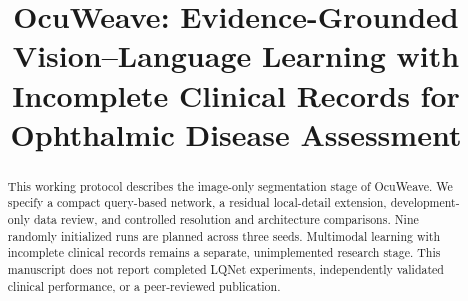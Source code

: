 \documentclass[conference]{IEEEtran}
\title{OcuWeave: Evidence-Grounded Vision--Language Learning with Incomplete Clinical Records for Ophthalmic Disease Assessment}
\author{\IEEEauthorblockN{Marchel Andrian Shevchenko}
\IEEEauthorblockA{Data Sorcerers\\2026}}
\begin{document}
\maketitle
\begin{abstract}
This working protocol describes the image-only segmentation stage of OcuWeave. We specify a compact query-based network, a residual local-detail extension, development-only data review, and controlled resolution and architecture comparisons. Nine randomly initialized runs are planned across three seeds. Multimodal learning with incomplete clinical records remains a separate, unimplemented research stage. This manuscript does not report completed LQNet experiments, independently validated clinical performance, or a peer-reviewed publication.
\end{abstract}




\end{document}
